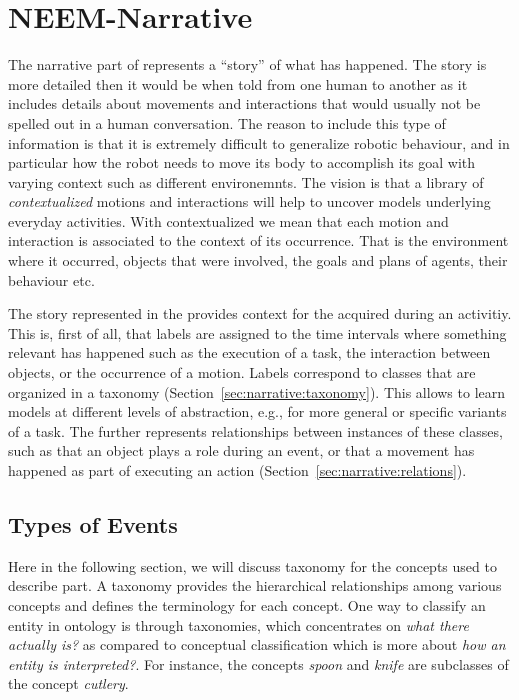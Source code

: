 
\chapter{NEEM-Narrative}
\label{ch:narrative}

The narrative part of \neems represents a ``story'' of what has happened.
The story is more detailed then it would be when told from one human to another
as it includes details about movements and interactions that would usually not be spelled out in a human conversation.
The reason to include this type of information is that it is extremely difficult to generalize robotic behaviour, and in particular how the robot needs to move its body to accomplish its goal with varying context such as different environemnts.
The vision is that a library of \emph{contextualized} motions and interactions will help to uncover models underlying everyday activities.
With contextualized we mean that each motion and interaction is associated to the context of its occurrence.
That is the environment where it occurred, objects that were involved, the goals and plans of agents, their behaviour etc.

The story represented in the \neemnar provides context for the \neemexp acquired during an activitiy.
This is, first of all, that labels are assigned to the time intervals where something relevant has happened such as the execution of a task, the interaction between objects, or the occurrence of a motion.
Labels correspond to classes that are organized in a taxonomy (Section~\ref{sec:narrative:taxonomy}).
This allows to learn models at different levels of abstraction, 
e.g., for more general or specific variants of a task.
The \neemnar further represents relationships between instances of these classes, such as that an object plays a role during an event, or that a movement has happened as part of executing an action
(Section~\ref{sec:narrative:relations}).

\section{Types of Events}
\label{sec:narrative:events} 

Here in the following section, we will discuss taxonomy for the concepts used to describe \neemnar part. A taxonomy provides the hierarchical relationships among various concepts and defines the terminology for each concept. One way to classify an entity in ontology is through taxonomies, which concentrates on \emph{what there actually is?} as compared to conceptual classification which is more about \emph{how an entity is interpreted?}. For instance, the concepts \textit{spoon} and \textit{knife} are subclasses of the concept \textit{cutlery}.

